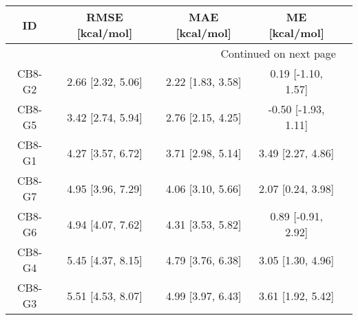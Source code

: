 \documentclass[8pt]{article}
\begin{document}
\begin{center}
\begin{footnotesize}
\begin{longtable}{|ccccc|}
\toprule
     ID &    RMSE [kcal/mol] &     MAE [kcal/mol] &        ME [kcal/mol] \\
\midrule
\endhead
\midrule
\multicolumn{4}{r}{{Continued on next page}} \\
\midrule
\endfoot

\bottomrule
\endlastfoot
 CB8-G2 &  2.66 [2.32, 5.06] &  2.22 [1.83, 3.58] &   0.19 [-1.10, 1.57] \\
 CB8-G5 &  3.42 [2.74, 5.94] &  2.76 [2.15, 4.25] &  -0.50 [-1.93, 1.11] \\
 CB8-G1 &  4.27 [3.57, 6.72] &  3.71 [2.98, 5.14] &    3.49 [2.27, 4.86] \\
 CB8-G7 &  4.95 [3.96, 7.29] &  4.06 [3.10, 5.66] &    2.07 [0.24, 3.98] \\
 CB8-G6 &  4.94 [4.07, 7.62] &  4.31 [3.53, 5.82] &   0.89 [-0.91, 2.92] \\
 CB8-G4 &  5.45 [4.37, 8.15] &  4.79 [3.76, 6.38] &    3.05 [1.30, 4.96] \\
 CB8-G3 &  5.51 [4.53, 8.07] &  4.99 [3.97, 6.43] &    3.61 [1.92, 5.42] \\
\end{longtable}
\end{footnotesize}
\end{center}
\end{document}
